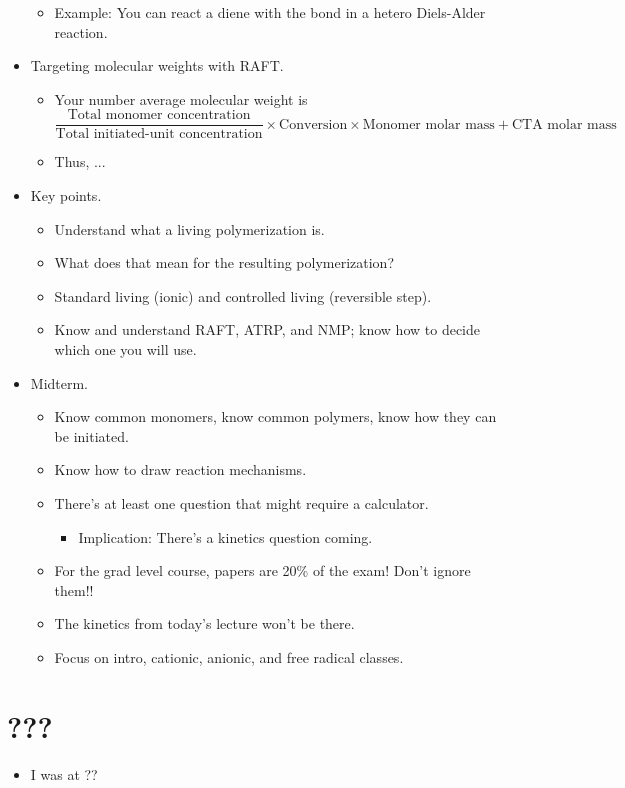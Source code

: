 \documentclass[../notes.tex]{subfiles}
\begin{document}
\begin{itemize}
\begin{itemize}
        \item Example: You can react a diene with the  bond in a hetero Diels-Alder reaction.
    \end{itemize}
    \item Targeting molecular weights with RAFT.
    \begin{itemize}
        \item Your number average molecular weight is
        \begin{equation*}
            \frac{\text{Total monomer concentration}}{\text{Total initiated-unit concentration}}\times\text{Conversion}\times\text{Monomer molar mass}+\text{CTA molar mass}
        \end{equation*}
        \item Thus,
        ...
    \end{itemize}
    \item Key points.
    \begin{itemize}
        \item Understand what a living polymerization is.
        \item What does that mean for the resulting polymerization?
        \item Standard living (ionic) and controlled living (reversible step).
        \item Know and understand RAFT, ATRP, and NMP; know how to decide which one you will use.
    \end{itemize}
    \item Midterm.
    \begin{itemize}
        \item Know common monomers, know common polymers, know how they can be initiated.
        \item Know how to draw reaction mechanisms.
        \item There's at least one question that might require a calculator.
        \begin{itemize}
            \item Implication: There's a kinetics question coming.
        \end{itemize}
        \item For the grad level course, papers are 20\% of the exam! Don't ignore them!!
        \item The kinetics from today's lecture won't be there.
        \item Focus on intro, cationic, anionic, and free radical classes.
    \end{itemize}
\end{itemize}



\section{???}
\begin{itemize}
    \item {}I was at ??
\end{itemize}
\end{document}
